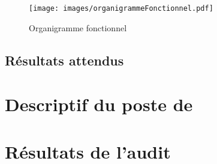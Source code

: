 \documentclass[asi]{picInsa}
\begin{document}
\begin{figure}
		\texttt{[image: images/organigrammeFonctionnel.pdf]}
		\caption{Organigramme fonctionnel}
		\label{organigramme}
	\end{figure}

\section{Résultats attendus}





\chapter{Descriptif du poste de \RQ}
\label{Descriptif}

\chapter{Résultats de l'audit}
\label{Resultats}

 
\begin{appendix}
\listoffigures
{}
	 
\listoftables
{}
\end{appendix}
\pageQuatriemeCouverture
\end{document}
